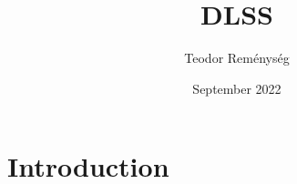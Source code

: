 \documentclass{article}
\title{DLSS}
\author{Teodor Reménység}
\date{September 2022}
\begin{document}
\maketitle

\section{Introduction}
\end{document}
